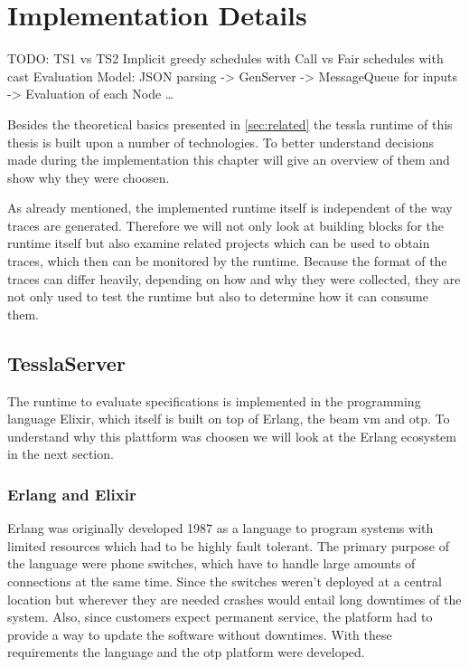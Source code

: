 %
\chapter{Implementation Details}
\label{sec:implementation}

TODO: TS1 vs TS2
      Implicit greedy schedules with Call vs Fair schedules with cast
      Evaluation Model: JSON parsing -> GenServer -> MessageQueue for inputs -> Evaluation of each Node \dots

Besides the theoretical basics presented in \cref{sec:related} the \gls{tessla} runtime of this thesis is built upon a number of technologies.
To better understand decisions made during the implementation this chapter will give an overview of them and show why they were choosen.

As already mentioned, the implemented runtime itself is independent of the way traces are generated.
Therefore we will not only look at building blocks for the runtime itself but also examine related projects which can be used to obtain traces, which then can be monitored by the runtime.
Because the format of the traces can differ heavily, depending on how and why they were collected, they are not only used to test the runtime but also to determine how it can consume them.

\section{TesslaServer}
\label{sec:implementation:tesslaserver}

The runtime to evaluate specifications is implemented in the programming language Elixir, which itself is built on top of Erlang, the \gls{beam} \gls{vm} and \gls{otp}.
To understand why this plattform was choosen we will look at the Erlang ecosystem in the next section.

\subsection{Erlang and Elixir}
\label{sec:implementation:tesslaserver:erlang_elixir}

Erlang was originally developed 1987 as a language to program systems with limited resources which had to be highly fault tolerant.
The primary purpose of the language were phone switches, which have to handle large amounts of connections at the same time.
Since the switches weren't deployed at a central location but wherever they are needed crashes would entail long downtimes of the system.
Also, since customers expect permanent service, the platform had to provide a way to update the software without downtimes.
With these requirements the language and the \gls{otp} platform were developed.

